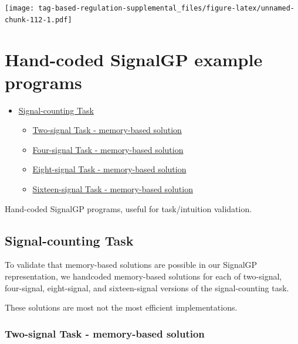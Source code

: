 \documentclass[]{book}
\providecommand{\tightlist}{%
  \setlength{\itemsep}{0pt}\setlength{\parskip}{0pt}}
\begin{document}
\texttt{[image: tag-based-regulation-supplemental\_files/figure-latex/unnamed-chunk-112-1.pdf]}

\hypertarget{hand-coded-signalgp-example-programs}{%
\chapter{Hand-coded SignalGP example programs}\label{hand-coded-signalgp-example-programs}}

\begin{itemize}
\tightlist
\item
  \protect\hyperlink{signal-counting-task}{Signal-counting Task}

  \begin{itemize}
  \tightlist
  \item
    \protect\hyperlink{two-signal-task---memory-based-solution}{Two-signal Task - memory-based solution}
  \item
    \protect\hyperlink{four-signal-task---memory-based-solution}{Four-signal Task - memory-based solution}
  \item
    \protect\hyperlink{eight-signal-task---memory-based-solution}{Eight-signal Task - memory-based solution}
  \item
    \protect\hyperlink{sixteen-signal-task---memory-based-solution}{Sixteen-signal Task - memory-based solution}
  \end{itemize}
\end{itemize}

Hand-coded SignalGP programs, useful for task/intuition validation.

\hypertarget{signal-counting-task}{%
\section{Signal-counting Task}\label{signal-counting-task}}

To validate that memory-based solutions are possible in our SignalGP representation, we handcoded memory-based
solutions for each of two-signal, four-signal, eight-signal, and sixteen-signal versions of the signal-counting task.

These solutions are most not the most efficient implementations.

\hypertarget{two-signal-task---memory-based-solution}{%
\subsection{Two-signal Task - memory-based solution}\label{two-signal-task---memory-based-solution}}
\end{document}
